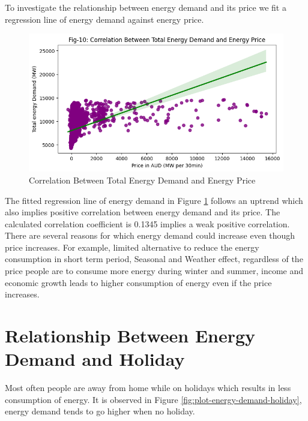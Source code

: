 \documentclass[mstat,12pt]{unswthesis}
\begin{document}
To investigate the relationship between energy demand and its price we
fit a regression line of energy demand against energy price.

\begin{figure}[H]
\includegraphics[width=1\linewidth,]{images/correlation_between_total_energy_demand_and_energy_price} \caption{Correlation Between Total Energy Demand and Energy Price}\label{fig:correlation-between-total-energy-demand-and-energy-price}
\end{figure}

The fitted regression line of energy demand in Figure
\ref{fig:correlation-between-total-energy-demand-and-energy-price}
follows an uptrend which also implies positive correlation between
energy demand and its price. The calculated correlation coefficient is
0.1345 implies a weak positive correlation. There are several reasons
for which energy demand could increase even though price increases. For
example, limited alternative to reduce the energy consumption in short
term period, Seasonal and Weather effect, regardless of the price people
are to consume more energy during winter and summer, income and economic
growth leads to higher consumption of energy even if the price
increases.

\hypertarget{relationship-between-energy-demand-and-holiday}{%
\section{Relationship Between Energy Demand and
Holiday}\label{relationship-between-energy-demand-and-holiday}}

Most often people are away from home while on holidays which results in
less consumption of energy. It is observed in Figure
\ref{fig:plot-energy-demand-holiday}, energy demand tends to go higher
when no holiday.
\end{document}
